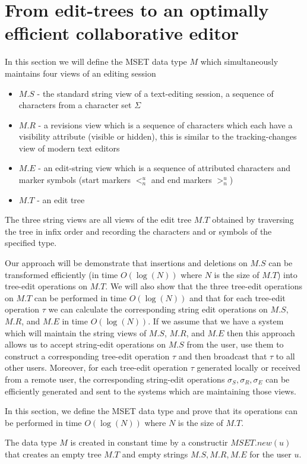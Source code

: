 \documentclass{amsart}
\begin{document}
\section{From edit-trees to an optimally efficient collaborative editor}
\label{sec:proof}
In this section we will define the MSET data type $M$ which simultaneously maintains
four views of an editing session
\begin{itemize}
\item $M.S$ - the standard string view of a text-editing session, a sequence of characters from a character set $\Sigma$
\item $M.R$ - a revisions view which is a sequence of characters which each have a visibility attribute (visible or hidden), this is similar to the tracking-changes view of modern text editors
\item $M.E$ - an edit-string view which is a sequence of attributed characters and marker symbols (start markers $<^u_n$ and end markers $>^u_n$)
\item $M.T$ - an edit tree
\end{itemize}
The three string views are all views of the edit tree $M.T$ obtained by traversing the tree in infix order and recording the characters and or symbols of the specified type.

Our approach will be demonstrate that insertions and deletions on $M.S$ can be
transformed efficiently (in time $O(\log(N))$ where $N$ is the size of $M.T$) into
tree-edit operations on $M.T$.  We will also show that the three tree-edit operations
on $M.T$ can be performed in time $O(\log(N))$ and that for each tree-edit operation $\tau$ we can calculate the corresponding string edit operations on $M.S$, $M.R$, and $M.E$ in time $O(\log(N))$.  If we assume that we have a system which will maintain the string views of $M.S$, $M.R$, and $M.E$ then this approach allows us to accept string-edit operations on $M.S$ from the user, use them to construct a corresponding tree-edit operation $\tau$ and then broadcast that $\tau$ to all other users.  Moreover, for each tree-edit operation $\tau$ generated locally or received from a remote user, the corresponding string-edit operations $\sigma_S, \sigma_R, \sigma_E$ can be efficiently generated and sent to the systems which are maintaining those views.

In this section, we define the MSET data type and prove that its operations can be performed in time $O(\log(N))$ where $N$ is the size of $M.T$.

The data type $M$ is created in constant time by a constructir $MSET.new(u)$ that creates an empty tree $M.T$ and empty strings $M.S, M.R, M.E$ for the user $u$.
\end{document}
